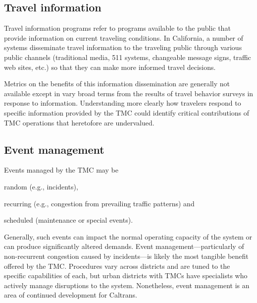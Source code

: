 \documentclass[12pt]{report}
\begin{document}
\subsection{Travel information}
\label{sec:trav-info}

Travel information programs refer to programs available to the public that
provide information on current traveling conditions. In California, a number of
systems disseminate travel information to the traveling public through various
public channels (traditional media, 511 systems, changeable message signs,
traffic web sites, etc.) so that they can make more informed travel decisions.

Metrics on the benefits of this information dissemination are generally not
available except in vary broad terms from the results of travel behavior surveys
in response to information. Understanding more clearly how travelers respond to
specific information provided by the TMC could identify critical contributions
of TMC operations that heretofore are undervalued.

\subsection{Event management}
\label{sec:event-man}

Events managed by the TMC may be
\begin{inparaenum}[(1)]
\item random (e.g., incidents),
\item recurring (e.g., congestion from prevailing traffic patterns)
  and
\item scheduled (maintenance or special events).
\end{inparaenum}
Generally, such events can impact the normal operating capacity of the system or
can produce significantly altered demands.  Event management---particularly of
non-recurrent congestion caused by incidents---is likely the most tangible
benefit offered by the TMC. Procedures vary across districts and are tuned to
the specific capabilities of each, but urban districts with TMCs have
specialists who actively manage disruptions to the system. Nonetheless, event
management is an area of continued development for Caltrans.
\end{document}
